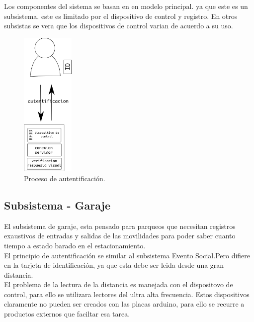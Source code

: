 \documentclass[11pt,twocolumn]{article}
\begin{document}
Los componentes del sistema se basan en en modelo principal. ya que este 
es un subsistema. este es limitado por el dispositivo de control y registro.
En otros subsistas se vera que los dispositivos de control varian de acuerdo
a su uso.\\

\begin{figure}[!h]
  \begin{center}
    \includegraphics[width=1in]{social-event.png}
  \end{center}

  \caption{\small Proceso de autentificaci\'on.}
  \label{fig-centinela}
\end{figure}



\subsection{Subsistema - Garaje}

El subsistema de garaje, esta pensado para parqueos que necesitan registros 
exaustivos de entradas y salidas de las movilidades para poder saber cuanto 
tiempo a estado barado en el estacionamiento.\\

El principio de autentificaci\'on se similar al subsistema Evento Social.Pero 
difiere en la tarjeta de identificaci\'on, ya que esta debe ser leida desde 
una gran distancia.\\

El problema de la lectura de la distancia es manejada con  el dispositovo de
 control, para ello se utilizara lectores del ultra alta frecuencia. Estos 
 dispositivos claramente no pueden ser creados con las placas arduino, para 
 ello se recurre a productos externos que faciltar esa tarea.\\
 
\end{document}
